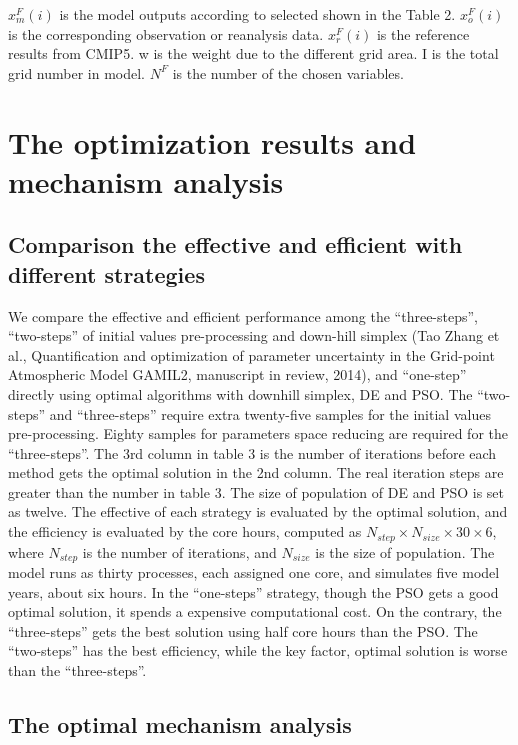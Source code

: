\documentclass[gmd, manuscript]{copernicus}
\begin{document}
$x_m^F(i)$ is the model outputs according to selected shown in the Table 2. $x_o^F(i)$ is the 
corresponding observation or reanalysis data. $x_r^F(i)$ is the reference results from CMIP5. w is 
the weight due to the different grid area. I is the total grid number in model. $N^F$ is the 
number of the chosen variables.


\section{The optimization results and mechanism analysis}

\subsection{Comparison the effective and efficient with different strategies}

We compare the effective and efficient performance among the ``three-steps'', ``two-steps'' of initial values pre-processing and down-hill simplex (Tao Zhang et al., Quantification and optimization of parameter uncertainty in the Grid-point Atmospheric Model GAMIL2, manuscript in review, 2014), and ``one-step'' directly using optimal algorithms with downhill simplex, DE and PSO. The ``two-steps'' and ``three-steps'' require extra twenty-five samples for the initial values pre-processing. Eighty samples for parameters space reducing are required for the ``three-steps''. The 3rd column in table 3 is the number of iterations before each method gets the optimal solution in the 2nd column. The real iteration steps are greater than the number in table 3. The size of population of DE and PSO is set as twelve. The effective of each strategy is evaluated by the optimal solution, and the efficiency is evaluated by the core hours, computed as $N_{step} \times N_{size} \times 30 \times 6$, where $N_{step}$ is the number of iterations, and $N_{size}$ is the size of population. The model runs as thirty processes, each assigned one core, and simulates five model years, about six hours. In the ``one-steps'' strategy, though the PSO gets a good optimal solution, it spends a expensive computational cost. On the contrary, the ``three-steps'' gets the best solution using half core hours than the PSO. The ``two-steps'' has the best efficiency, while the key factor, optimal solution is worse than the ``three-steps''.


\subsection{The optimal mechanism analysis}
\end{document}
